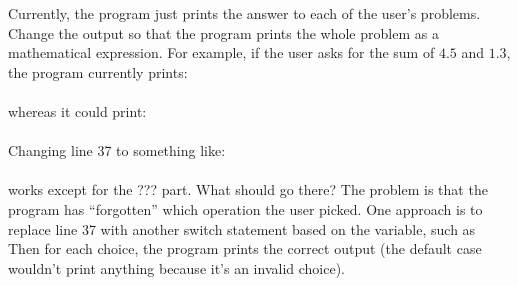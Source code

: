 Currently, the program just prints the answer to each of the user's problems.  Change the output so that the program prints the whole problem as a mathematical expression.  For example, if the user asks for the sum of $4.5$ and $1.3$, the program currently prints:\\
\\
whereas it could print:\\
\\
Changing line 37 to something like:\\
\\
works except for the ??? part.  What should go there?  The problem is that the program has ``forgotten'' which operation the user picked.  One approach is to replace line 37 with another switch statement based on the  variable, such as\\
Then for each choice, the program prints the correct output (the default case wouldn't print anything because it's an invalid choice).

